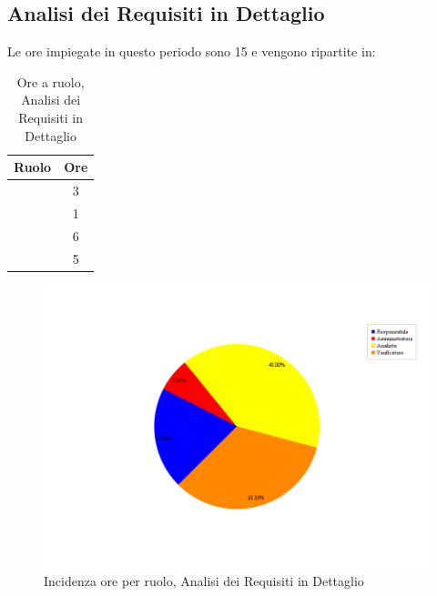 \newpage
\subsection{Analisi dei Requisiti in Dettaglio}
Le ore impiegate in questo periodo sono 15 e vengono ripartite in:

\begin{table}[H]
	\begin{center}
		\begin{tabular}{|c|c|}
			\hline
			\textbf{Ruolo}	& \textbf{Ore} \\
			\hline
			\Res	&	3	\\
			\hline
			\Amm	&	1	\\
			\hline
			\Ana	&	6	\\
			\hline
			\Ver	&	5	\\
			\hline
		\end{tabular}
	\end{center}
	\caption{Ore a ruolo, Analisi dei Requisiti in Dettaglio}
\end{table}

\begin{figure}[ht]
	\centering
	\includegraphics[scale=0.5]{immagini/Grafi/OreRuoloRRD}
	\caption{Incidenza ore per ruolo, Analisi dei Requisiti in Dettaglio}
\end{figure} \FloatBarrier

\newpage
